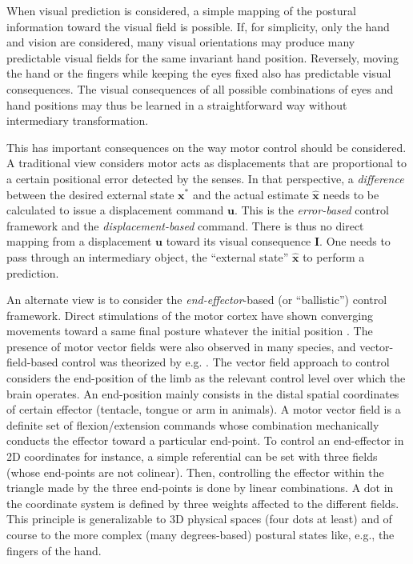 \documentclass[11pt]{article}
\begin{document}
When visual prediction is considered, a simple mapping of the postural information toward the visual field is possible.
If, for simplicity, only the hand and vision are considered, many visual orientations may produce many predictable  visual fields for the same invariant hand position. Reversely, moving the hand or the fingers while keeping the eyes  fixed also has predictable visual consequences. 
The visual consequences of all possible combinations of eyes and hand positions may thus be learned in a straightforward way without intermediary transformation. 

This has important consequences on the way motor control should be considered. A traditional view considers motor acts as displacements that are proportional to a certain positional error detected by the senses. In that perspective, a \emph{difference} between the desired external state $\boldsymbol{x}^*$ and the actual estimate $\hat{\boldsymbol{x}}$ needs to be calculated to issue a displacement command $\boldsymbol{u}$. This is the \emph{error-based} control framework and the \emph{displacement-based} command. There is thus no direct mapping from a displacement  $\boldsymbol{u}$ toward its visual consequence $\boldsymbol{I}$. One needs to pass through an intermediary object, the ``external state'' $\hat{\boldsymbol{x}}$  to perform a prediction. 

An alternate view is to consider the \emph{end-effector}-based (or ``ballistic'') control framework. 
Direct stimulations of the motor cortex have shown converging movements toward a same final posture whatever the initial position  . The presence of motor vector fields were also observed in many species, and vector-field-based control was theorized by e.g. . The vector field approach to control considers the end-position of the limb as the relevant control level over which the brain operates. An end-position mainly consists in the distal spatial coordinates of certain effector (tentacle, tongue or arm in animals). A motor vector field is a definite set of flexion/extension commands whose combination mechanically conducts the effector toward a particular end-point. To control an end-effector in 2D coordinates for instance, a simple referential can be set with three fields (whose end-points are not colinear). Then, controlling the effector within the triangle made by the three end-points is done by linear combinations. A dot in the coordinate system is defined by three weights affected to the different fields. 
This principle is generalizable to 3D physical spaces (four dots at least) and of course to the more complex (many degrees-based) postural states like, e.g., the fingers of the hand.
\end{document}
